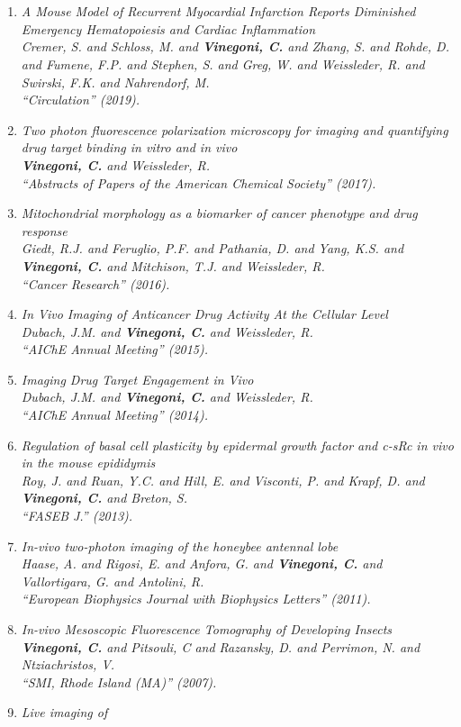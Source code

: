 \documentclass{resume}
\newcommand{\titresection}[1]
{
  \vspace{0em}
  \definecolor{gris_clair}{rgb}{0.90, 0.90, 0.90}
  \colorbox{gris_clair}{\makebox[\textwidth][l]{\rule[-0.1em]{0em}{0.5em}\large{\textsc{#1}}}} \\
}
\begin{document}
\begin{category}{~~}
\hypertarget{conferencesa}{\citemnobullet
\titresection{\textbf{\large PUBLICATIONS: CONFERENCES}}}
\begin{enumerate}

\item \it A Mouse Model of Recurrent Myocardial Infarction Reports Diminished Emergency Hematopoiesis and Cardiac Inflammation \\ Cremer, S. and Schloss, M. and {\bf Vinegoni, C.} and Zhang, S. and Rohde, D. and Fumene, F.P. and Stephen, S. and Greg, W. and Weissleder, R. and Swirski, F.K. and Nahrendorf, M. \\ ``Circulation''  (2019). \item \it Two photon fluorescence polarization microscopy for imaging and quantifying drug target binding in vitro and in vivo \\ {\bf Vinegoni, C.} and Weissleder, R. \\ ``Abstracts of Papers of the American Chemical Society''  (2017). \item \it Mitochondrial morphology as a biomarker of cancer phenotype and drug response \\ Giedt, R.J. and Feruglio, P.F. and Pathania, D. and Yang, K.S. and {\bf Vinegoni, C.} and Mitchison, T.J. and Weissleder, R. \\ ``Cancer Research''  (2016). \item \it In Vivo Imaging of Anticancer Drug Activity At the Cellular Level \\ Dubach, J.M. and {\bf Vinegoni, C.} and Weissleder, R. \\ ``AIChE Annual Meeting''  (2015). \item \it Imaging Drug Target Engagement in Vivo \\ Dubach, J.M. and {\bf Vinegoni, C.} and Weissleder, R. \\ ``AIChE Annual Meeting''  (2014). \item \it Regulation of basal cell plasticity by epidermal growth factor and c-sRc in vivo in the mouse epididymis \\ Roy, J. and Ruan, Y.C. and Hill, E. and Visconti, P. and Krapf, D. and {\bf Vinegoni, C.} and Breton, S. \\ ``FASEB J.''  (2013). \item \it In-vivo two-photon imaging of the honeybee antennal lobe \\ Haase, A. and Rigosi, E. and Anfora, G. and {\bf Vinegoni, C.} and Vallortigara, G. and Antolini, R. \\ ``European Biophysics Journal with Biophysics Letters''  (2011). \item \it In-vivo Mesoscopic Fluorescence Tomography of Developing Insects \\ {\bf Vinegoni, C.} and Pitsouli, C and Razansky, D. and Perrimon, N. and Ntziachristos, V. \\ ``SMI, Rhode Island (MA)''  (2007). \item \it Live imaging of 
\end{enumerate}
\end{category}
\end{document}
